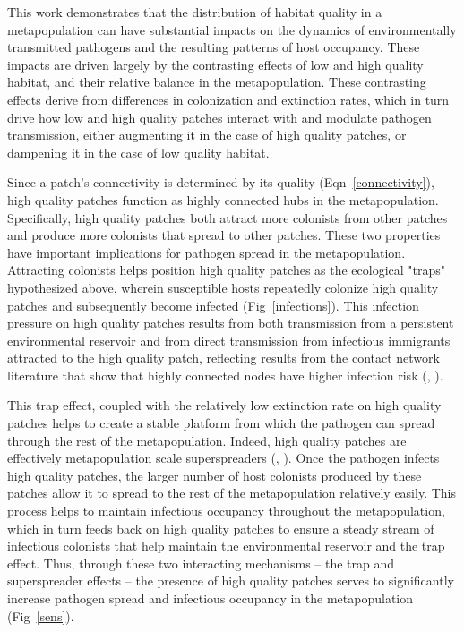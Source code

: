 \documentclass{svjour3}
\begin{document}
This work demonstrates that the distribution of habitat quality in a metapopulation can have substantial impacts on the dynamics of environmentally transmitted pathogens and the resulting patterns of host occupancy.  These impacts are driven largely by the contrasting effects of low and high quality habitat, and their relative balance in the metapopulation.  These contrasting effects derive from differences in colonization and extinction rates, which in turn drive how low and high quality patches interact with and modulate pathogen transmission, either augmenting it in the case of high quality patches, or dampening it in the case of low quality habitat.   

Since a patch's connectivity is determined by its quality (Eqn~\ref{connectivity}), high quality patches function as highly connected hubs in the metapopulation.  Specifically, high quality patches both attract more colonists from other patches and produce more colonists that spread to other patches.  These two properties have important implications for pathogen spread in the metapopulation. Attracting colonists helps position high quality patches as the ecological "traps" hypothesized above, wherein susceptible hosts repeatedly colonize high quality patches and subsequently become infected (Fig~\ref{infections}).  This infection pressure on high quality patches results from both transmission from a persistent environmental reservoir and from direct transmission from infectious immigrants attracted to the high quality patch, reflecting results from the contact network literature that show that highly connected nodes have higher infection risk (\cite{Christley2005}, \cite{Keeling2005}).  

This trap effect, coupled with the relatively low extinction rate on high quality patches helps to create a stable platform from which the pathogen can spread through the rest of the metapopulation.  Indeed, high quality patches are effectively metapopulation scale superspreaders (\cite{Lloyd-Smith2005}, \cite{Paull2012}).  Once the pathogen infects high quality patches, the larger number of host colonists produced by these patches allow it to spread to the rest of the metapopulation relatively easily.  This process helps to maintain infectious occupancy throughout the metapopulation, which in turn feeds back on high quality patches to ensure a steady stream of infectious colonists that help maintain the environmental reservoir and the trap effect.  Thus, through these two interacting mechanisms -- the trap and superspreader effects -- the presence of high quality patches serves to significantly increase pathogen spread and infectious occupancy in the metapopulation (Fig~\ref{sens}).  
\end{document}
